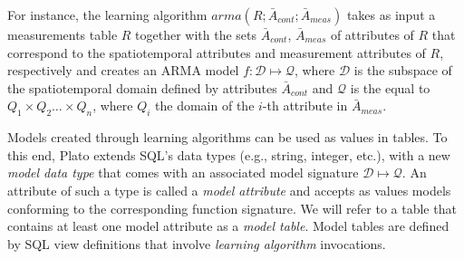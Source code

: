 \vspace*{0.5cm}
\begin{example}
For instance, the learning algorithm $arma(R;{\bar{A}_{cont}}; \bar{A}_{meas})$ takes as input a measurements table $R$ together with the sets $\bar{A}_{cont}$, $\bar{A}_{meas}$ of attributes of $R$ that correspond to the spatiotemporal attributes and measurement attributes of $R$, respectively and creates an ARMA model $f:\mathcal{D}\mapsto\mathcal{Q}$, where $\mathcal{D}$ is the subspace of the spatiotemporal domain defined by attributes $\bar{A}_{cont}$ and $\mathcal{Q}$ is the equal to $Q_1 \times Q_2 \ldots \times Q_n$, where $Q_i$ the domain of the $i$-th attribute in $\bar{A}_{meas}$. 
\end{example}  
\vspace*{0.5cm}

Models created through learning algorithms can be used as values in tables. To this end, Plato extends SQL's data types (e.g., string, integer, etc.), with a new {\em model data type} that comes with an associated model signature $\mathcal{D}\mapsto \mathcal{Q}$. An attribute of such a type is called a {\em model attribute} and accepts as values models conforming to the corresponding function signature. We will refer to a table that contains at least one model attribute as a {\em model table}. Model tables are defined by SQL view definitions that involve {\em learning algorithm} invocations. 

